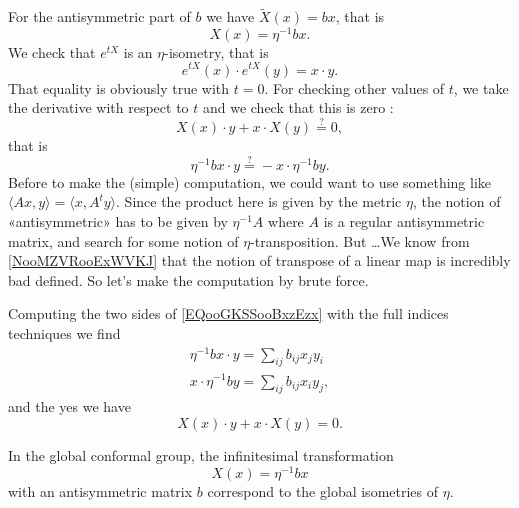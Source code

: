 \begin{description}
    For the antisymmetric part of \(b\)  we have \( \tilde X(x)=bx\), that is
    \begin{equation}
        X(x)=\eta^{-1}bx.
    \end{equation}
    We check that \(  e^{tX}\) is an \( \eta\)-isometry, that is
    \begin{equation}
        e^{tX}(x)\cdot  e^{tX}(y)=x\cdot y.
    \end{equation}
    That equality is obviously true with \( t=0\). For checking other values of \( t\), we take the derivative with respect to \( t\) and we check that this is zero :
    \begin{equation}
        X(x)\cdot y+x\cdot X(y)\stackrel{?}{=}0,
    \end{equation}
    that is
    \begin{equation}    \label{EQooGKSSooBxzEzx}
        \eta^{-1}bx\cdot y\stackrel{?}{=}-x\cdot \eta^{-1}by.
    \end{equation}
    Before to make the (simple) computation, we could want to use something like \( \langle Ax, y\rangle =\langle x, A^ty\rangle \). Since the product here is given by the metric \( \eta\), the notion of «antisymmetric» has to be given by \( \eta^{-1}A\) where \( A\) is a regular antisymmetric matrix, and search for some notion of \( \eta\)-transposition. But \ldots We know from \ref{NooMZVRooExWVKJ} that the notion of transpose of a linear map is incredibly bad defined. So let's make the computation by brute force.

    Computing the two sides of \eqref{EQooGKSSooBxzEzx} with the full indices techniques we find
    \begin{subequations}
        \begin{align}
            \eta^{-1}bx\cdot y=\sum_{ij}b_{ij}x_jy_i\\
            x\cdot \eta^{-1}by=\sum_{ij}b_{ij}x_iy_j,
        \end{align}
    \end{subequations}
    and the yes we have 
    \begin{equation}
        X(x)\cdot y+x\cdot X(y)=0.
    \end{equation}

    In the global conformal group, the infinitesimal transformation
    \begin{equation}
        X(x)=\eta^{-1}bx
    \end{equation}
    with an antisymmetric matrix \( b\) correspond to the global isometries of \( \eta\).


\end{description}
